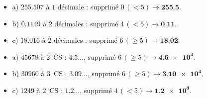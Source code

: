 \documentclass[11pt,a4paper]{article}
\begin{document}
\begin{cor}
\begin{itemize}[leftmargin=1.6em,itemsep=1pt]
  \item a) $\num{255,507}$ à $1$ décimale : supprimé $0\,(<5)\to \mathbf{\num{255,5}}$.
  \item b) $\num{0,1149}$ à $2$ décimales : supprimé $4\,(<5)\to \mathbf{\num{0,11}}$.
  \item c) $\num{18,016}$ à $2$ décimales : supprimé $6\,(\ge5)\to \mathbf{\num{18,02}}$.
\end{itemize}
\end{cor}

\begin{cor}
\begin{itemize}[leftmargin=1.6em,itemsep=1pt]
  \item a) $\num{45678}$ à $2$~CS : $\num{4,5}\dots$, supprimé $6\,(\ge5)\to \mathbf{\num{4,6e4}}$.
  \item b) $\num{30960}$ à $3$~CS : $\num{3,09}\dots$, supprimé $6\,(\ge5)\to \mathbf{\num{3,10e4}}$.
  \item c) $\num{1249}$ à $2$~CS : $\num{1,2}\dots$, supprimé $4\,(<5)\to \mathbf{\num{1,2e3}}$.
\end{itemize}
\end{cor}
\end{document}

